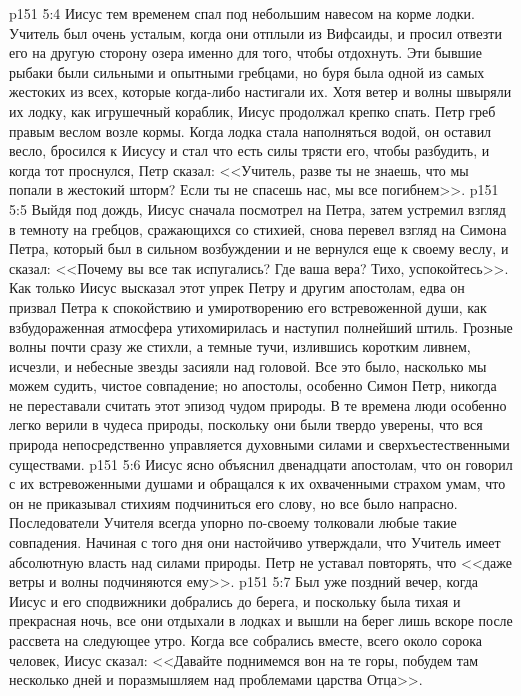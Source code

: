 \vs p151 5:4 Иисус тем временем спал под небольшим навесом на корме лодки. Учитель был очень усталым, когда они отплыли из Вифсаиды, и просил отвезти его на другую сторону озера именно для того, чтобы отдохнуть. Эти бывшие рыбаки были сильными и опытными гребцами, но буря была одной из самых жестоких из всех, которые когда\hyp{}либо настигали их. Хотя ветер и волны швыряли их лодку, как игрушечный кораблик, Иисус продолжал крепко спать. Петр греб правым веслом возле кормы. Когда лодка стала наполняться водой, он оставил весло, бросился к Иисусу и стал что есть силы трясти его, чтобы разбудить, и когда тот проснулся, Петр сказал: <<Учитель, разве ты не знаешь, что мы попали в жестокий шторм? Если ты не спасешь нас, мы все погибнем>>.
\vs p151 5:5 Выйдя под дождь, Иисус сначала посмотрел на Петра, затем устремил взгляд в темноту на гребцов, сражающихся со стихией, снова перевел взгляд на Симона Петра, который был в сильном возбуждении и не вернулся еще к своему веслу, и сказал: <<Почему вы все так испугались? Где ваша вера? Тихо, успокойтесь>>. Как только Иисус высказал этот упрек Петру и другим апостолам, едва он призвал Петра к спокойствию и умиротворению его встревоженной души, как взбудораженная атмосфера утихомирилась и наступил полнейший штиль. Грозные волны почти сразу же стихли, а темные тучи, излившись коротким ливнем, исчезли, и небесные звезды засияли над головой. Все это было, насколько мы можем судить, чистое совпадение; но апостолы, особенно Симон Петр, никогда не переставали считать этот эпизод чудом природы. В те времена люди особенно легко верили в чудеса природы, поскольку они были твердо уверены, что вся природа непосредственно управляется духовными силами и сверхъестественными существами.
\vs p151 5:6 Иисус ясно объяснил двенадцати апостолам, что он говорил с их встревоженными душами и обращался к их охваченными страхом умам, что он не приказывал стихиям подчиниться его слову, но все было напрасно. Последователи Учителя всегда упорно по\hyp{}своему толковали любые такие совпадения. Начиная с того дня они настойчиво утверждали, что Учитель имеет абсолютную власть над силами природы. Петр не уставал повторять, что <<даже ветры и волны подчиняются ему>>.
\vs p151 5:7 Был уже поздний вечер, когда Иисус и его сподвижники добрались до берега, и поскольку была тихая и прекрасная ночь, все они отдыхали в лодках и вышли на берег лишь вскоре после рассвета на следующее утро. Когда все собрались вместе, всего около сорока человек, Иисус сказал: <<Давайте поднимемся вон на те горы, побудем там несколько дней и поразмышляем над проблемами царства Отца>>.
